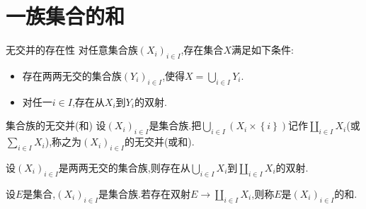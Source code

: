 \section{一族集合的和}

\begin{proposition}{无交并的存在性}{}
	对任意集合族$\left(X_{i}\right)_{i\in I}$,存在集合$X$满足如下条件:
	\begin{itemize}
		\item 存在两两无交的集合族$\left(Y_{i}\right)_{i\in I}$,使得$X=\bigcup\limits_{i\in I}Y_{i}$.
		\item 对任一$i\in I$,存在从$X_{i}$到$Y_{i}$的双射.
	\end{itemize}
\end{proposition}

\begin{definition}{集合族的无交并(和)}{}
	设$\left(X_{i}\right)_{i\in I}$是集合族.把$\bigcup\limits_{i\in I}\left(X_{i}\times\left\{i\right\}\right)$记作$\coprod\limits_{i\in I}X_{i}$(或$\sum\limits_{i\in I}X_{i}$),称之为$\left(X_{i}\right)_{i\in I}$的无交并(或和).
\end{definition}

\begin{proposition}{}{}
	设$\left(X_{i}\right)_{i\in I}$是两两无交的集合族,则存在从$\bigcup\limits_{i\in I}X_{i}$到$\coprod\limits_{i\in I}X_{i}$的双射.
\end{proposition}

\begin{definition}{}{}
	设$E$是集合,$\left(X_{i}\right)_{i\in I}$是集合族.若存在双射$E\to\coprod\limits_{i\in I}X_{i}$,则称$E$是$\left(X_{i}\right)_{i\in I}$的和.
\end{definition}

